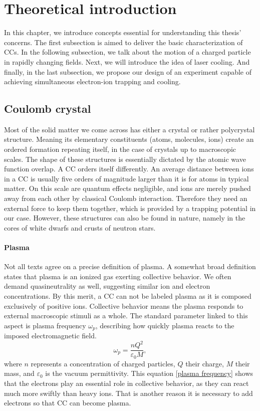 \chapter{Theoretical introduction}
\label{chap:intro}

In this chapter, we introduce concepts essential for understanding this thesis' concerns. The first subsection is aimed to deliver the basic characterization of CCs. In the following subsection, we talk about the motion of a charged particle in rapidly changing fields. Next, we will introduce the idea of laser cooling. And finally, in the last subsection, we propose our design of an experiment capable of achieving simultaneous electron-ion trapping and cooling.

\section{Coulomb crystal}
Most of the solid matter we come across has either a crystal or rather polycrystal structure. Meaning its elementary constituents (atoms, molecules, ions) create an ordered formation repeating itself, in the case of crystals up to macroscopic scales. The shape of these structures \cite{drewsen2003ion} is essentially dictated by the atomic wave function overlap. A CC orders itself differently. An average distance between ions in a CC is usually \cite{thompson2015ion} five orders of magnitude larger than it is for atoms in typical matter. On this scale are quantum effects negligible, and ions are merely pushed away from each other by classical Coulomb interaction. Therefore they need an external force to keep them together, which is provided by a trapping potential in our case. However, these structures can also be found in nature, namely in the cores of white dwarfs and crusts of neutron stars.

\subsubsection{Plasma}
Not all texts agree on a precise definition of plasma. A somewhat broad definition \cite{fitzpatrick2014plasma} states that plasma is an ionized gas exerting collective behavior. We often demand quasineutrality as well, suggesting similar ion and electron concentrations. By this merit, a CC can not be labeled plasma as it is composed exclusively of positive ions. Collective behavior means the plasma responds to external macroscopic stimuli as a whole. The standard parameter linked to this aspect is plasma frequency $\omega_p$, describing how quickly plasma reacts to the imposed electromagnetic field.
\begin{equation}
	\label{plasma frequency}
	\omega_p = \frac{n Q^2}{\varepsilon_0 M},
\end{equation}
where $n$ represents a concentration of charged particles, $Q$ their charge, $M$ their mass, and $\varepsilon_0$ is the vacuum permittivity. This equation \eqref{plasma frequency} shows that the electrons play an essential role in collective behavior, as they can react much more swiftly than heavy ions. That is another reason it is necessary to add electrons so that CC can become plasma.

